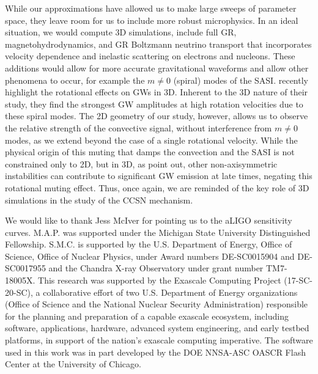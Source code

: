 \documentclass[twocolumn,times]{aastex62}  %
\begin{document}

While our approximations have allowed us to make large sweeps of parameter space, they leave room for us to include more robust microphysics.  In an ideal situation, we would compute 3D simulations, include full GR, magnetohydrodynamics, and GR Boltzmann neutrino transport that incorporates velocity dependence and inelastic scattering on electrons and nucleons.  These additions would allow for more accurate gravitational waveforms and allow other phenomena to occur, for example the $m\ne 0$ (spiral) modes of the SASI. \citet{andresen:2018} recently highlight the rotational effects on GWs in 3D.  Inherent to the 3D nature of their study, they find the strongest GW amplitudes at high rotation velocities due to these spiral modes.  The 2D geometry of our study, however, allows us to observe the relative strength of the convective signal, without interference from $m\ne 0$ modes, as we extend beyond the case of a single rotational velocity.
While the physical origin of this muting that damps the convection and the SASI is not constrained only to 2D, but in 3D, as \citet{andresen:2018} point out, other non-axisymmetric instabilities can contribute to significant GW emission at late times, negating this rotational muting effect.
Thus, once again, we are reminded of the key role of 3D simulations in the study of the CCSN mechanism.

\acknowledgements

We would like to thank Jess McIver for pointing us to the aLIGO sensitivity curves.  M.A.P. was supported under the Michigan State University Distinguished Fellowship. 
S.M.C. is supported by the U.S. Department of Energy, Office of Science, Office of Nuclear Physics,
under Award numbers DE-SC0015904 and DE-SC0017955 and the Chandra
X-ray Observatory under grant number TM7-18005X.
This research was supported by the Exascale Computing Project (17-SC-20-SC), a collaborative effort of two U.S. Department of Energy organizations (Office of Science and the National Nuclear Security Administration) responsible for the planning and preparation of a capable exascale ecosystem, including software, applications, hardware, advanced system engineering, and early testbed platforms, in support of the nation’s exascale computing imperative.
The software used in this
work was in part developed by the DOE NNSA-ASC OASCR Flash Center at
the University of Chicago.  
\end{document}
